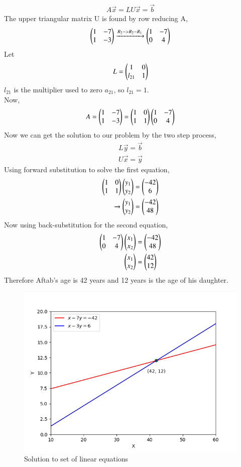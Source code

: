 \documentclass[journal]{IEEEtran}
\begin{document}
\begin{align}
    A\vec{x} = LU\vec{x} = \vec{b}
\end{align}
The upper triangular matrix U is found by row reducing A,
\begin{align}
    \begin{pmatrix}1 & -7 \\ 1 & -3 \end{pmatrix} \xrightarrow{R_2 -> R_2 - R_1} \begin{pmatrix}1 & -7 \\ 0 & 4\end{pmatrix}  
\end{align}
Let 
\begin{align}
    L = \begin{pmatrix}1 & 0\\ l_{21} & 1\end{pmatrix}
\end{align}
$l_{21}$ is the multiplier used to zero $a_{21}$, so $l_{21} = 1$.\\
\newline
Now,
\begin{align}
    A = \begin{pmatrix}1 & -7 \\ 1 & -3\end{pmatrix} = \begin{pmatrix}1 & 0 \\ 1 & 1\end{pmatrix}\begin{pmatrix}1 & -7 \\ 0 & 4\end{pmatrix}
\end{align}
Now we can get the solution to our problem by the two step process,
\begin{align}
    L\vec{y} = \vec{b}\\
    U\vec{x} = \vec{y}
\end{align}
Using forward substitution to solve the first equation,
\begin{align}
    \begin{pmatrix}1 & 0 \\ 1 & 1\end{pmatrix}\begin{pmatrix}y_1 \\ y_2\end{pmatrix} &= \begin{pmatrix}-42 \\ 6\end{pmatrix}\\
    \xrightarrow{} \begin{pmatrix}y_1 \\ y_2\end{pmatrix} &= \begin{pmatrix}-42 \\ 48\end{pmatrix} 
\end{align}
Now using back-substitution for the second equation,
\begin{align}
    \begin{pmatrix}1 & -7 \\ 0 & 4\end{pmatrix}\begin{pmatrix}x_1 \\ x_2\end{pmatrix} &= \begin{pmatrix}-42 \\ 48\end{pmatrix}\\
    \begin{pmatrix}x_1 \\ x_2\end{pmatrix} &= \begin{pmatrix}42 \\ 12\end{pmatrix}
\end{align}
Therefore Aftab's age is 42 years and 12 years is the age of his daughter.
\begin{figure}[h!]
   \centering
   \includegraphics[width=0.7\columnwidth]{figs/fig.png}
    \caption{Solution to set of linear equations}
\end{figure}
\end{document}
